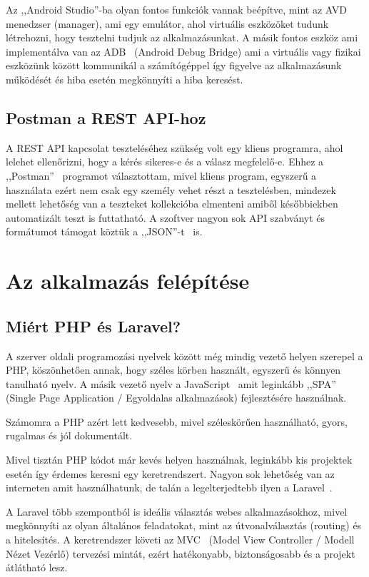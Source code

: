 \documentclass[
]{thesis-ekf}
\theoremstyle{definition}
\theoremstyle{remark}
\begin{document}
Az ,,Android Studio''-ba olyan fontos funkciók vannak beépítve, mint az AVD~\cite{androidStudioAvd_doc} menedzser (manager), ami egy emulátor, ahol virtuális eszközöket tudunk létrehozni, hogy tesztelni tudjuk az alkalmazásunkat. A másik fontos eszköz ami implementálva van az ADB~\cite{androidStudioAdb_doc} (Android Debug Bridge) ami a virtuális vagy fizikai eszközünk között kommunikál a számítógéppel így figyelve az alkalmazásunk működését és hiba esetén megkönnyíti a hiba keresést. 
\section{Postman a REST API-hoz}
A REST API kapcsolat teszteléséhez szükség volt egy kliens programra, ahol lelehet ellenőrizni, hogy a kérés sikeres-e és a válasz megfelelő-e. Ehhez a ,,Postman''~\cite{postman_doc} programot választottam, mivel kliens program, egyszerű a használata ezért nem csak egy személy vehet részt a tesztelésben, mindezek mellett lehetőség van a teszteket kollekcióba elmenteni amiből későbbiekben automatizált teszt is futtatható. A szoftver nagyon sok API szabványt és formátumot támogat köztük a ,,JSON''-t~\cite{json_doc} is.

\chapter{Az alkalmazás felépítése}
\section{Miért PHP és Laravel?}
A szerver oldali programozási nyelvek között még mindig vezető helyen szerepel a PHP, köszönhetően annak, hogy széles körben használt, egyszerű és könnyen tanulható nyelv. A másik vezető nyelv a JavaScript~\cite{js_book} amit leginkább ,,SPA'' (Single Page Application / Egyoldalas alkalmazások) fejlesztésére használnak. 

Számomra a PHP azért lett kedvesebb, mivel széleskörűen használható, gyors, rugalmas és jól dokumentált. 

Mivel tisztán PHP kódot már kevés helyen használnak, leginkább kis projektek esetén így érdemes keresni egy keretrendszert. Nagyon sok lehetőség van az interneten amit használhatunk, de talán a legelterjedtebb ilyen a Laravel~\cite{laravel_book}. 

A Laravel több szempontból is ideális választás webes alkalmazásokhoz, mivel megkönnyíti az olyan általános feladatokat, mint az útvonalválasztás (routing) és a hitelesítés. A keretrendszer követi az MVC~\cite{mvc_pattern} (Model View Controller / Modell Nézet Vezérlő) tervezési mintát, ezért hatékonyabb, biztonságosabb és a projekt átlátható lesz. 
\end{document}

